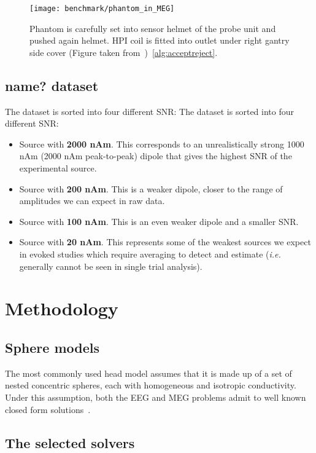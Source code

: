 \begin{figure}[tb]
   \centering
\texttt{[image: benchmark/phantom\_in\_MEG]}
\caption{Phantom is carefully set into sensor helmet of the probe unit and pushed again helmet. HPI coil is fitted into outlet under right gantry side cover (Figure taken from~\cite{hazim2015magnetoencephalography})~\ref{alg:acceptreject}.}
   \label{fig:phantom_in_MEG}
\end{figure}


\subsection{name? dataset} \label{data:used_data}

The dataset is sorted into four different SNR:
The dataset is sorted into four different SNR:
\begin{itemize}
\item Source with \textbf{2000 nAm}. This corresponds to an unrealistically strong 1000 nAm (2000 nAm peak-to-peak) dipole that gives the highest SNR of the experimental source.
\item Source with \textbf{200 nAm}. This is a weaker dipole, closer to the range of amplitudes we can expect in raw data.
\item Source with \textbf{100 nAm}. This is an even weaker dipole and a smaller SNR.
\item Source with \textbf{20 nAm}. This represents some of the weakest sources we expect in evoked studies which require averaging to detect and estimate (\textit{i.e.} generally cannot be seen in single trial analysis).
\end{itemize}

\section{Methodology}

\subsection{Sphere models}
The most commonly used head model assumes that it is made up of a set of nested concentric spheres, each with homogeneous and isotropic conductivity. Under this assumption, both the EEG and MEG problems admit to well known closed form solutions~\cite{mosher1999eeg}.

\subsection{The selected solvers}

